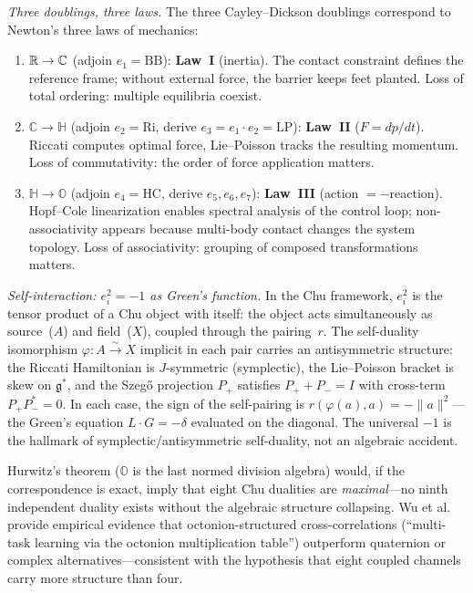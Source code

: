 \begin{remark}
\medskip\noindent\emph{Three doublings, three laws.}
The three Cayley--Dickson doublings correspond to Newton's three
laws of mechanics:
\begin{enumerate}[nosep]
\item $\mathbb{R} \to \mathbb{C}$ (adjoin $e_1 = \text{BB}$):
  \textbf{Law~I} (inertia).
  The contact constraint defines the reference frame; without
  external force, the barrier keeps feet planted.
  Loss of total ordering: multiple equilibria coexist.
\item $\mathbb{C} \to \mathbb{H}$ (adjoin $e_2 = \text{Ri}$,
  derive $e_3 = e_1 \cdot e_2 = \text{LP}$):
  \textbf{Law~II} ($F = dp/dt$).
  Riccati computes optimal force, Lie--Poisson tracks the
  resulting momentum.
  Loss of commutativity: the order of force application matters.
\item $\mathbb{H} \to \mathbb{O}$ (adjoin $e_4 = \text{HC}$,
  derive $e_5, e_6, e_7$):
  \textbf{Law~III} (action $= -$reaction).
  Hopf--Cole linearization enables spectral analysis of the
  control loop; non-associativity appears because multi-body
  contact changes the system topology.
  Loss of associativity: grouping of composed transformations
  matters.
\end{enumerate}

\medskip\noindent\emph{Self-interaction: $e_i^2 = -1$ as
Green's function.}
In the Chu framework, $e_i^2$ is the tensor product of a Chu
object with itself: the object acts simultaneously as source~($A$)
and field~($X$), coupled through the pairing~$r$.
The self-duality isomorphism $\varphi \colon A \xrightarrow{\sim} X$
implicit in each pair carries an antisymmetric structure:
the Riccati Hamiltonian is $J$-symmetric (symplectic),
the Lie--Poisson bracket is skew on $\mathfrak{g}^*$,
and the Szeg\H{o} projection $P_+$ satisfies
$P_+ + P_- = I$ with cross-term $P_+ P_-^* = 0$.
In each case, the sign of the self-pairing is
$r(\varphi(a), a) = -\|a\|^2$---the Green's equation
$L \cdot G = -\delta$ evaluated on the diagonal.
The universal $-1$ is the hallmark of symplectic/antisymmetric
self-duality, not an algebraic accident.

\medskip
Hurwitz's theorem ($\mathbb{O}$ is the last normed division
algebra) would, if the correspondence is exact, imply that eight
Chu dualities are \emph{maximal}---no ninth independent duality
exists without the algebraic structure collapsing.
Wu et al.~\cite{WuOctonion} provide empirical evidence that
octonion-structured cross-correlations (``multi-task learning via
the octonion multiplication table'') outperform quaternion or
complex alternatives---consistent with the hypothesis that eight
coupled channels carry more structure than four.
\end{remark}

